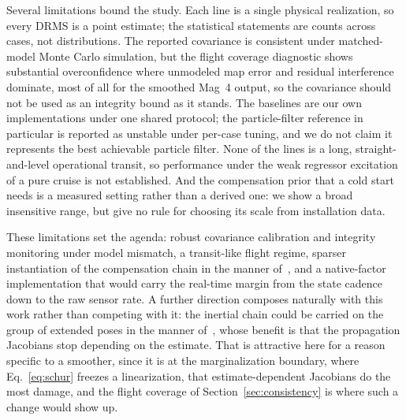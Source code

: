 \documentclass{IEEEtaes}
\begin{document}
Several limitations bound the study. Each line is a single physical
realization, so every DRMS is a point estimate; the statistical statements are
counts across cases, not distributions. The reported covariance is consistent
under matched-model Monte Carlo simulation, but the flight coverage
diagnostic shows substantial overconfidence where unmodeled map error and
residual interference dominate, most of all for the smoothed Mag~4 output, so
the covariance should not be used as an integrity bound as it stands. The
baselines are our own implementations under one shared protocol; the
particle-filter reference in particular is reported as unstable under per-case
tuning, and we do not claim it represents the best achievable particle filter.
None of the lines is a long, straight-and-level operational transit, so
performance under the weak regressor excitation of a pure cruise is not
established. And the compensation prior that a cold start needs is a measured
setting rather than a derived one: we show a broad insensitive range, but give
no rule for choosing its scale from installation data.

These limitations set the agenda: robust covariance calibration and integrity
monitoring under model mismatch, a transit-like flight regime, sparser
instantiation of the compensation chain in the manner of~\cite{park2024}, and
a native-factor implementation that would carry the real-time margin from the
state cadence down to the raw sensor rate. A further direction composes
naturally with this work rather than competing with it: the inertial chain
could be carried on the group of extended poses in the manner
of~\cite{hager2025lie}, whose benefit is that the propagation Jacobians stop
depending on the estimate. That is attractive here for a reason specific to a
smoother, since it is at the marginalization boundary, where
Eq.~\eqref{eq:schur} freezes a linearization, that estimate-dependent
Jacobians do the most damage, and the flight coverage of
Section~\ref{sec:consistency} is where such a change would show up.

\appendices
\end{document}
